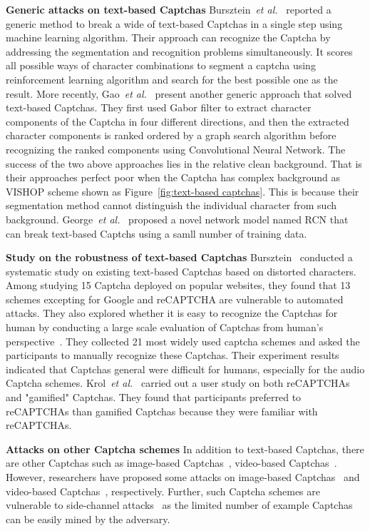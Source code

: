 \noindent \textbf{Generic attacks on text-based Captchas} Bursztein~\emph{et al.}~\cite{Bursztein2014The} reported a generic method to break a wide of text-based Captchas in a single step using machine learning algorithm. Their approach can recognize the Captcha by addressing the segmentation and recognition problems simultaneously. It scores all possible ways of character combinations to segment a captcha using reinforcement learning algorithm and search for the best possible one as the result.
More recently, Gao~\emph{et al.}~\cite{Gao2016A} present another generic approach that solved text-based Captchas. They first used Gabor filter to extract character components of the Captcha in four different directions, and then the extracted character components is ranked ordered by a graph search algorithm before recognizing the ranked components using Convolutional Neural Network.
The success of the two above approaches lies in the relative clean background. That is their approaches perfect poor when the Captcha has complex background as VISHOP scheme shown as Figure~\ref{fig:text-based captchas}. This is because their segmentation method cannot distinguish the individual character from such background.
George~\emph{et al.}~\cite{George2017A} proposed a novel network model named RCN that can break text-based Captchs using a samll number of training data.

\noindent \textbf{Study on the robustness of text-based Captchas} Bursztein~\cite{Bursztein2011Text} conducted a systematic study on existing text-based Captchas based on distorted characters. Among studying 15 Captcha deployed on popular websites, they found that 13 schemes excepting for Google and reCAPTCHA are vulnerable to automated attacks. They also explored whether it is easy to recognize the Captchas for human by conducting a large scale evaluation of Captchas from human's perspective~\cite{Bursztein2010How}. They collected 21 most widely used captcha schemes and asked the participants to manually recognize these Captchas. Their experiment results indicated that Captchas general were difficult for humans, especially for the audio Captcha schemes.
Krol~\emph{et al.}~\cite{Krol2016Better} carried out a user study on both reCAPTCHAs and "gamified" Captchas. They found that participants preferred to reCAPTCHAs than gamified Captchas because they were familiar with reCAPTCHAs.

\noindent \textbf{Attacks on other Captcha schemes} In addition to text-based Captchas, there are other Captchas such as image-based Captchas~\cite{Elson2007Asirra, Athanasopoulos2006Enhanced, Areyouhuman, Mohamed2017On, Gossweiler2009What}, video-based Captchas~\cite{Schlaikjer2010A, Bigham2009Evaluating}.
However, researchers have proposed some attacks on image-based Captchas~\cite{Mohamed2014A, Gao2014An} and video-based Captchas~\cite{Tam2008Breaking, Meutzner2014Reducing, Bursztein2009Decaptcha}, respectively. Further, such Captcha schemes are vulnerable to side-channel attacks~\cite{Hernandezcastro2009Side} as the limited number of example Captchas can be easily mined by the adversary.

